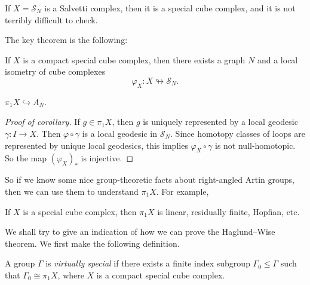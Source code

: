 \documentclass[a4paper]{article}
\begin{document}
\begin{eg}
  If $X = \mathcal{S}_N$ is a Salvetti complex, then it is a special cube complex, and it is not terribly difficult to check.
\end{eg}

The key theorem is the following:
\begin{thm}
  If $X$ is a compact special cube complex, then there exists a graph $N$ and a local isometry of cube complexes
  \[
    \varphi_X: X \looparrowright \mathcal{S}_N.
  \]
\end{thm}

\begin{cor}
  $\pi_1 X \hookrightarrow A_N$.
\end{cor}

\begin{proof}[Proof of corollary]
  If $g \in \pi_1 X$, then $g$ is uniquely represented by a local geodesic $\gamma: I \to X$. Then $\varphi \circ \gamma$ is a local geodesic in $\mathcal{S}_N$. Since homotopy classes of loops are represented by unique local geodesics, this implies $\varphi_X \circ \gamma$ is not null-homotopic. So the map $(\varphi_X)_*$ is injective.
\end{proof}

So if we know some nice group-theoretic facts about right-angled Artin groups, then we can use them to understand $\pi_1X$. For example,
\begin{cor}
  If $X$ is a special cube complex, then $\pi_1 X$ is linear, residually finite, Hopfian, etc.
\end{cor}
We shall try to give an indication of how we can prove the Haglund--Wise theorem. We first make the following definition.
\begin{defi}
  A group $\Gamma$ is \emph{virtually special} if there exists a finite index subgroup $\Gamma_0 \leq \Gamma$ such that $\Gamma_0 \cong \pi_1 X$, where $X$ is a compact special cube complex.
\end{defi}
\end{document}
